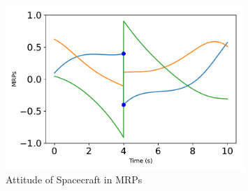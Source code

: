\begin{figure}[htbp]\centerline{\includegraphics[width=0.8\textwidth]{AutoTeX/scPlusMRPs}}\caption{Attitude of Spacecraft in MRPs}\label{fig:scPlusMRPs}\end{figure}